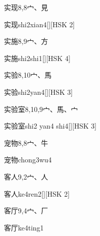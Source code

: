 \begin{entry}{实现}{8,8}{⼧、⾒}
  \begin{phonetics}{实现}{shi2xian4}[][HSK 2]
  \end{phonetics}
\end{entry}

\begin{entry}{实施}{8,9}{⼧、⽅}
  \begin{phonetics}{实施}{shi2shi1}[][HSK 4]
  \end{phonetics}
\end{entry}

\begin{entry}{实验}{8,10}{⼧、⾺}
  \begin{phonetics}{实验}{shi2yan4}[][HSK 3]
  \end{phonetics}
\end{entry}

\begin{entry}{实验室}{8,10,9}{⼧、⾺、⼧}
  \begin{phonetics}{实验室}{shi2 yan4 shi4}[][HSK 3]
  \end{phonetics}
\end{entry}

\begin{entry}{宠物}{8,8}{⼧、⽜}
  \begin{phonetics}{宠物}{chong3wu4}
  \end{phonetics}
\end{entry}

\begin{entry}{客人}{9,2}{⼧、⼈}
  \begin{phonetics}{客人}{ke4ren2}[][HSK 2]
  \end{phonetics}
\end{entry}

\begin{entry}{客厅}{9,4}{⼧、⼚}
  \begin{phonetics}{客厅}{ke4ting1}
  \end{phonetics}
\end{entry}

